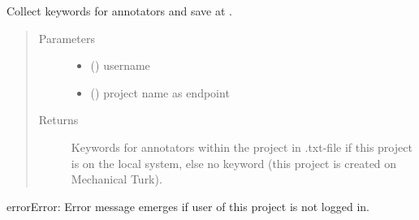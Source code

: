 \documentclass[a4paper,12pt,english]{sphinxmanual}
\begin{document}
\begin{fulllineitems}
\label{\detokenize{project_rst/user_rst/routes:project.user.outputs.get_keywords}}
Collect keywords for annotators and save at .
\begin{quote}\begin{description}
\item[{Parameters}] \leavevmode\begin{itemize}
\item {} 
 () \textendash{} username

\item {} 
 () \textendash{} project name as endpoint

\end{itemize}

\item[{Returns}] \leavevmode
Keywords for annotators within the project in .txt-file
if this project is on the local system, else no keyword
(this project is created on Mechanical Turk).

\end{description}\end{quote}

\begin{sphinxadmonition}{error}{Error:}
Error message emerges if user of this project is not logged in.
\end{sphinxadmonition}

\end{fulllineitems}

\end{document}
